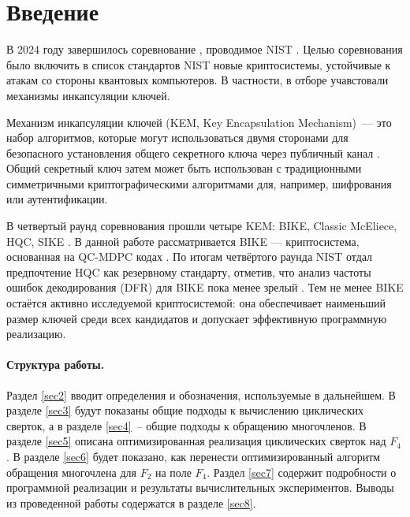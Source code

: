\documentclass[14pt]{mmcs_article}
\theoremstyle{break}
\begin{document}
\renewcommand{\contentsname}{Оглавление}
\tableofcontents
\newpage

\section{Введение}

В 2024 году завершилось соревнование , проводимое NIST \cite{nist-post-quantum-crypto-standardization}. Целью соревнования было включить в список стандартов NIST новые криптосистемы, устойчивые к атакам со стороны квантовых компьютеров. В частности, в отборе учавстовали механизмы инкапсуляции ключей.

Механизм инкапсуляции ключей (KEM, Key Encapsulation Mechanism)~--- это набор алгоритмов, которые могут использоваться двумя сторонами для безопасного установления общего секретного ключа через публичный канал \cite{nist-recommendations-for-kems}. Общий секретный ключ затем может быть использован с традиционными симметричными криптографическими алгоритмами для, например, шифрования или аутентификации.

В четвертый раунд соревнования прошли четыре KEM: BIKE, Classic McEliece, HQC, SIKE \cite{nist-round-4-report}. В данной работе рассматривается BIKE --- криптосистема, основанная на QC-MDPC кодах \cite{bike-website}. По итогам четвёртого раунда NIST отдал предпочтение HQC как резервному стандарту, отметив, что анализ частоты ошибок декодирования (DFR) для BIKE пока менее зрелый \cite{nist-pqc-status-report-on-fourth-round}. Тем не менее BIKE остаётся активно исследуемой криптосистемой: она обеспечивает наименьший размер ключей среди всех кандидатов и допускает эффективную программную реализацию. 

\paragraph{Структура работы.} Раздел \ref{sec2} вводит определения и обозначения, используемые в дальнейшем. В разделе \ref{sec3} будут показаны общие подходы к вычислению циклических сверток, а в разделе \ref{sec4}~-- общие подходы к обращению многочленов. В разделе \ref{sec5} описана оптимизированная реализация циклических сверток над $F_4$. В разделе \ref{sec6} будет показано, как перенести оптимизированный алгоритм обращения многочлена для $F_2$ на поле $F_4$. Раздел \ref{sec7} содержит подробности о программной реализации и результаты вычислительных экспериментов. Выводы из проведенной работы содержатся в разделе \ref{sec8}.
\end{document}
